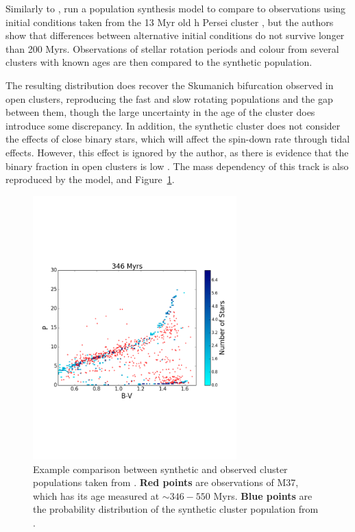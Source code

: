 Similarly to \citet{matt2015}, \citet{garraffo2018a} run a population synthesis model to compare to observations using initial conditions taken from the 13 Myr old h Persei cluster \citep{moraux2013}, but the authors show that differences between alternative initial conditions do not survive longer than 200 Myrs. Observations of stellar rotation periods and colour from several clusters with known ages are then compared to the synthetic population.

The resulting distribution does recover the Skumanich bifurcation observed in open clusters, reproducing the fast and slow rotating populations and the gap between them, though the large uncertainty in the age of the cluster does introduce some discrepancy.
In addition, the synthetic cluster does not consider the effects of close binary stars, which will affect the spin-down rate through tidal effects. However, this effect is ignored by the author, as there is evidence that the binary fraction in open clusters is low \citep{meibom2007}.
The mass dependency of this track is also reproduced by the model, and Figure~\ref{fig:introduction:garraffo 2018a fig 4}.
\begin{figure}
    \centering
    \includegraphics[width=0.7\textwidth, trim={0 5cm 0 5cm}]{figures/introduction/garraffo2018_M37_346_hPer.pdf}
    \caption{Example comparison between synthetic and observed cluster populations taken from \citet{garraffo2018a}. {\bf Red points} are observations of M37, which has its age measured at $\sim 346 - 550$ Myrs. {\bf Blue points} are the probability distribution of the synthetic cluster population from \citet{garraffo2018a}.}
    \label{fig:introduction:garraffo 2018a fig 4}
\end{figure}


